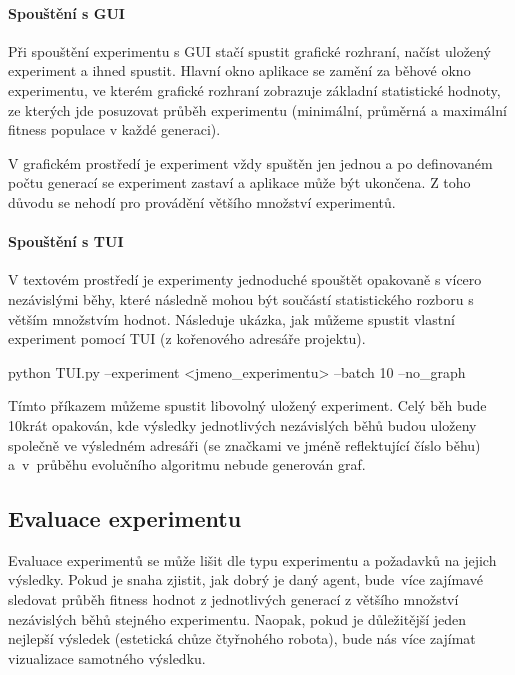 \paragraph{Spouštění s GUI}
Při spouštění experimentu s GUI stačí spustit grafické rozhraní, načíst uložený
experiment a ihned spustit. Hlavní okno aplikace se zamění za běhové okno
experimentu, ve kterém grafické rozhraní zobrazuje základní statistické
hodnoty, ze kterých jde posuzovat průběh experimentu (minimální, průměrná a
maximální fitness populace v každé generaci). 

V grafickém prostředí je experiment vždy spuštěn jen jednou a po definovaném
počtu generací se experiment zastaví a aplikace může být ukončena. Z toho
důvodu se nehodí pro provádění většího množství experimentů.

\paragraph{Spouštění s TUI}
V textovém prostředí je experimenty jednoduché spouštět opakovaně s vícero
nezávislými běhy, které následně mohou být součástí statistického rozboru s
větším množstvím hodnot. Následuje ukázka, jak můžeme spustit vlastní
experiment pomocí TUI (z kořenového adresáře projektu).
\begin{code}
python TUI.py --experiment <jmeno_experimentu> --batch 10 --no_graph
\end{code}
Tímto příkazem můžeme spustit libovolný uložený experiment. Celý běh bude
10krát opakován, kde výsledky jednotlivých nezávislých běhů budou uloženy
společně ve výsledném adresáři (se značkami ve jméně reflektující číslo běhu)
a~v~průběhu evolučního algoritmu nebude generován graf.

\subsection{Evaluace experimentu} \label{doc_23_seasoning}
Evaluace experimentů se může lišit dle typu experimentu a požadavků na jejich
výsledky. Pokud je snaha zjistit, jak dobrý je daný agent, bude~více zajímavé
sledovat průběh fitness hodnot z jednotlivých generací z většího množství
nezávislých běhů stejného experimentu. Naopak, pokud je důležitější jeden
nejlepší výsledek (estetická chůze čtyřnohého robota), bude nás více zajímat
vizualizace samotného výsledku.

